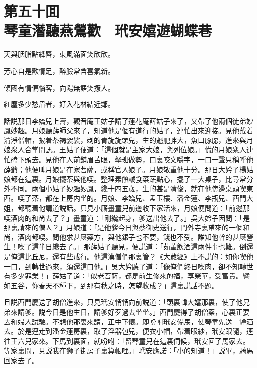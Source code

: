 
\chapter*{第五十囬　\\琴童潛聽燕鶯歡　玳安嬉遊蝴蝶巷}


\begin{myquote}
天與胭脂點絳唇，東風滿面笑欣欣。

芳心自是歡情足，醉臉常含喜氣新。

傾國有情偏惱客，向陽無語笑撩人。

紅塵多少愁眉者，好入花林結近鄰。
\end{myquote}

話説那日李嬌兒上壽，觀音庵王姑子請了蓮花庵薛姑子來了，又帶了他兩個徒弟妙鳳妙趣。月娘聽薛師父來了，知道他是個有道行的姑子，連忙出來迎接。見他戴着清淨僧帽，披着茶褐袈裟，剃的青旋旋頭兒，生的魁肥胖大，魚口豚腮，進來與月娘衆人合掌問訊。王姑子便道：「這個就是主家大娘，與列位娘。」慌的月娘衆人連忙磕下頭去。見他在人前鋪眉苫眼，拏班做勢，口裏咬文嚼字，一口一聲只稱呼他薛爺；他便叫月娘是在家菩薩，或稱官人娘子。月娘敬重他十分。那日大妗子楊姑娘都在這裏。月娘擺茶與他喫。整理素饌鹹食菜蔬點心，擺了一大桌子，比尋常分外不同。兩個小姑子妙趣妙鳳，纔十四五歲，生的甚是清俊，就在他傍邊桌頭喫東西。喫了茶，都在上房内坐的。月娘、李嬌兒、孟玉樓、潘金蓮、李瓶兒、西門大姐，都聽着他講道説話。只見小廝畫童兒前邊收下家活來，月娘便問道：「前邊那喫酒肉的和尚去了？」畫童道：「剛纔起身，爹送出他去了。」吳大妗子因問：「是那裏請來的僧人？」月娘道：「是他爹今日與蔡御史送行，門外寺裏帶來的一個和尚，酒肉都喫。問他求甚麽薬方，與他銀子也不要，錢也不受。誰知他幹的甚麽營生！喫了這半日纔去了。」那薛姑子聽見，便説道：「茹葷飲酒這兩件事也難。倒還是俺這比丘尼，還有些戒行。他這漢僧們那裏管？《大藏經》上不説的：如你喫他一口，到轉世過來，須還這口他。」吳大妗聽了道：「像俺們終日喫肉，卻不知轉世有多少罪業！」薛姑子道：「似老菩薩，都是前生修來的福，享榮華，受富貴。譬如五谷，你春天不種下，到那有秋之時，怎望收成？」這裏説話不題。

且説西門慶送了胡僧進來，只見玳安悄悄向前説道：「頭裏韓大嬸那裏，使了他兄弟來請爹。説今日是他生日，請爹好歹過去坐坐。」西門慶得了胡僧薬，心裏正要去和婦人試驗。不想他那裏來請，正中下懷。即吩咐玳安備馬，使琴童先送一罈酒去。於是逕走到潘金蓮房裏，取了淫器包兒，便衣小帽，帶着眼紗，玳安跟隨，逕往王六兒家來。下馬到裏面，就吩咐：「留琴童兒在這裏伺候，玳安回了馬家去。等家裏問，只説我在獅子街房子裏算帳哩。」玳安應諾：「小的知道！」説畢，騎馬回家去了。

